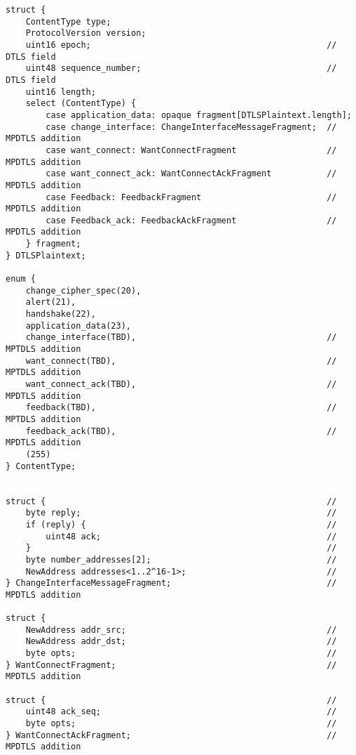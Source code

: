 \begin{lstlisting}
struct {
    ContentType type;
    ProtocolVersion version;
    uint16 epoch;                                               // DTLS field
    uint48 sequence_number;                                     // DTLS field
    uint16 length;
    select (ContentType) {
        case application_data: opaque fragment[DTLSPlaintext.length];
        case change_interface: ChangeInterfaceMessageFragment;  // MPDTLS addition
        case want_connect: WantConnectFragment                  // MPDTLS addition
        case want_connect_ack: WantConnectAckFragment           // MPDTLS addition
        case Feedback: FeedbackFragment                         // MPDTLS addition
        case Feedback_ack: FeedbackAckFragment                  // MPDTLS addition
    } fragment;
} DTLSPlaintext;

enum {
    change_cipher_spec(20),
    alert(21),
    handshake(22),
    application_data(23),
    change_interface(TBD),                                      // MPTDLS addition
    want_connect(TBD),                                          // MPTDLS addition
    want_connect_ack(TBD),                                      // MPDTLS addition
    feedback(TBD),                                              // MPTDLS addition
    feedback_ack(TBD),                                          // MPDTLS addition
    (255)
} ContentType;


struct {                                                        //
    byte reply;                                                 //
    if (reply) {                                                //
        uint48 ack;                                             //
    }                                                           //
    byte number_addresses[2];                                   //
    NewAddress addresses<1..2^16-1>;                            //
} ChangeInterfaceMessageFragment;                               // MPDTLS addition

struct {
    NewAddress addr_src;                                        //
    NewAddress addr_dst;                                        //
    byte opts;                                                  //
} WantConnectFragment;                                          // MPDTLS addition

struct {                                                        //
    uint48 ack_seq;                                             //
    byte opts;                                                  //
} WantConnectAckFragment;                                       // MPDTLS addition


\end{lstlisting}
